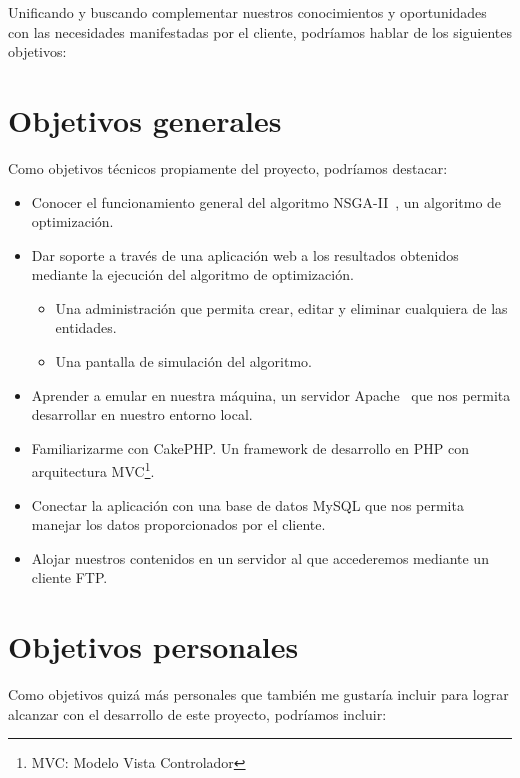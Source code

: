 
Unificando y buscando complementar nuestros conocimientos y oportunidades con las necesidades manifestadas por el cliente, podríamos hablar de los siguientes objetivos:

\section{Objetivos generales}

Como objetivos técnicos propiamente del proyecto, podríamos destacar:

\begin{itemize}
	\item Conocer el funcionamiento general del algoritmo NSGA-II~\cite{pdf:nsga-ii}, un algoritmo de optimización.
	
	\item Dar soporte a través de una aplicación web a los resultados obtenidos mediante la ejecución del algoritmo de optimización.
	\begin{itemize}
		\item Una administración que permita crear, editar y eliminar cualquiera de las entidades.
		\item Una pantalla de simulación del algoritmo.
	\end{itemize}
	\item Aprender a emular en nuestra máquina, un servidor Apache~\cite{web:apache} que nos permita desarrollar en nuestro entorno local.
	
	\item Familiarizarme con CakePHP. Un framework de desarrollo en PHP con arquitectura MVC\footnote{MVC: Modelo Vista Controlador}.
	
	\item Conectar la aplicación con una base de datos MySQL que nos permita manejar los datos proporcionados por el cliente.
	
	\item Alojar nuestros contenidos en un servidor al que accederemos mediante un cliente FTP.
\end{itemize}

\section{Objetivos personales}

Como objetivos quizá más personales que también me gustaría incluir para lograr alcanzar con el desarrollo de este proyecto, podríamos incluir:

